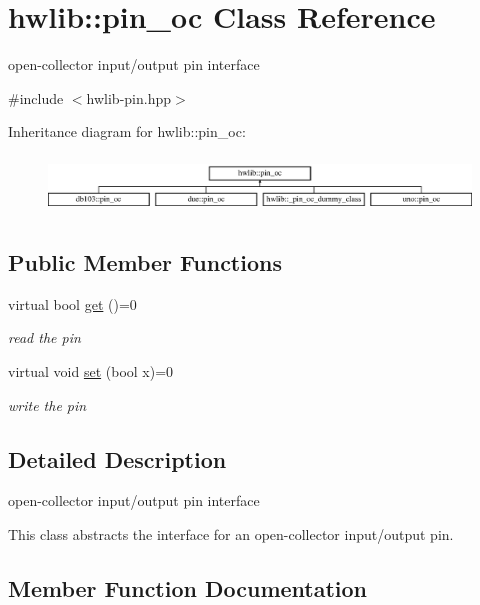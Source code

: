 \hypertarget{classhwlib_1_1pin__oc}{}\section{hwlib\+:\+:pin\+\_\+oc Class Reference}
\label{classhwlib_1_1pin__oc}


open-\/collector input/output pin interface  




{\ttfamily \#include $<$hwlib-\/pin.\+hpp$>$}

Inheritance diagram for hwlib\+:\+:pin\+\_\+oc\+:\begin{figure}[H]
\begin{center}
\leavevmode
\includegraphics[height=1.538461cm]{classhwlib_1_1pin__oc}
\end{center}
\end{figure}
\subsection*{Public Member Functions}
\begin{DoxyCompactItemize}
\item 
virtual bool \hyperlink{classhwlib_1_1pin__oc_aa395bf9608ca48ca07dee2f5dc4612bd}{get} ()=0
\begin{DoxyCompactList}\small\item\em read the pin \end{DoxyCompactList}\item 
virtual void \hyperlink{classhwlib_1_1pin__oc_a2165622dad253a423d2fa52cbed7c553}{set} (bool x)=0
\begin{DoxyCompactList}\small\item\em write the pin \end{DoxyCompactList}\end{DoxyCompactItemize}


\subsection{Detailed Description}
open-\/collector input/output pin interface 

This class abstracts the interface for an open-\/collector input/output pin. 

\subsection{Member Function Documentation}
